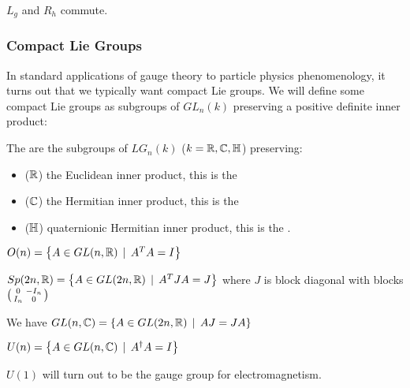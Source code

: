 \documentclass{article}
\begin{document}
\begin{lemma}
	$L_g$ and $R_h$ commute. 
\end{lemma}
\subsubsection{Compact Lie Groups}
In standard applications of gauge theory to particle physics phenomenology, it turns out that we typically want compact Lie groups. We will define some compact Lie groups as subgroups of $GL_n(k)$ preserving a positive definite inner product:

\begin{definition}
	The  are the subgroups of $LG_n(k)$ ($k=\mathbb{R},\mathbb{C},\mathbb{H}$) preserving:
	\begin{itemize}
		\item ($\mathbb{R}$) the Euclidean inner product, this is the 
		\item ($\mathbb{C}$) the Hermitian inner product, this is the 
		\item ($\mathbb{H}$) quaternionic Hermitian inner product, this is the .
	\end{itemize} 
\end{definition} 

\begin{example}
	$O(n) = \left\{ A \in GL(n,\mathbb{R}) \, \mid \, A^T A = I \right\}$
\end{example}

\begin{example}
	$Sp(2n,\mathbb{R}) = \left\{ A \in GL(2n,\mathbb{R}) \, \mid \, A^T J A = J \right\}$ where $J$ is block diagonal with blocks $\begin{psmallmatrix} 0 & -I_n \\ I_n & 0 \end{psmallmatrix}$
\end{example}

\begin{example}
	We have $GL(n,\mathbb{C}) = \left\{ A \in GL(2n,\mathbb{R}) \, \mid \, AJ=JA \right\}$
\end{example}

\begin{example}
	$U(n) = \left\{ A \in GL(n,\mathbb{C}) \, \mid \, A^\dagger A = I \right\}$
\end{example}
\begin{remark}
	$U(1)$ will turn out to be the gauge group for electromagnetism. 	
\end{remark}
\end{document}

